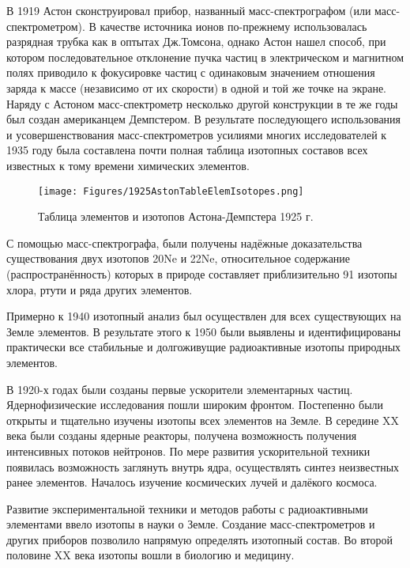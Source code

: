\documentclass[a5paper,openany]{book}
\begin{document}
В 1919 Астон сконструировал прибор, названный масс-спектрографом (или масс-спектрометром). В качестве источника ионов по-прежнему использовалась разрядная трубка как в оптытах Дж.Томсона, однако
Астон нашел способ, при котором последовательное отклонение пучка частиц в электрическом и
магнитном полях приводило к фокусировке частиц с одинаковым значением отношения заряда к массе
(независимо от их скорости) в одной и той же точке на экране. Наряду с Астоном масс-спектрометр
несколько другой конструкции в те же годы был создан американцем Демпстером. В результате
последующего использования и усовершенствования масс-спектрометров усилиями многих
исследователей к 1935 году была составлена почти полная таблица изотопных составов всех известных
к тому времени химических элементов.

\begin{figure}[ht] 
	\centering\small
	\unitlength=1mm
	\texttt{[image: Figures/1925AstonTableElemIsotopes.png]} 
	\caption{Таблица элементов и изотопов Астона-Демпстера 1925 г.} 
	\label{f:Aston1925}
\end{figure}	


С помощью масс-спектрографа, были получены надёжные доказательства существования двух
изотопов 20Ne и
22Ne, относительное содержание (распространённость) которых в природе составляет
приблизительно 91%
изотопы хлора, ртути и ряда других элементов. 

Примерно к 1940 изотопный анализ был осуществлен
для всех существующих на Земле элементов. В результате этого к 1950 были выявлены и
идентифицированы практически все стабильные и долгоживущие радиоактивные изотопы природных
элементов. 



В 1920-х годах были созданы первые ускорители элементарных частиц.
Ядернофизические исследования пошли широким фронтом. Постепенно были открыты и тщательно изучены изотопы всех элементов на Земле. 
В середине XX века были созданы ядерные реакторы, получена возможность получения интенсивных потоков нейтронов. По мере развития ускорительной техники появилась возможность заглянуть внутрь ядра, осуществлять синтез неизвестных ранее элементов. Началось изучение космических лучей и далёкого космоса. 

Развитие экспериментальной техники и методов работы с радиоактивными элементами ввело изотопы в науки о Земле. Создание масс-спектрометров и других приборов позволило напрямую определять изотопный состав. Во второй половине XX века изотопы вошли в биологию и медицину.
\end{document}
